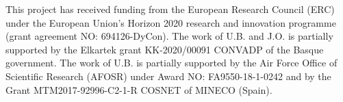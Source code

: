 \documentclass[twocolumn]{autart}    %
\begin{document}
\begin{ack}            
This project has received funding from the European Research Council (ERC) under the European Union’s Horizon 2020 research and innovation programme (grant agreement NO: 694126-DyCon). The work of U.B. and J.O. is partially supported by the Elkartek grant KK-2020/00091 CONVADP of the Basque government. The work of U.B. is partially supported by the Air Force Office of Scientific Research (AFOSR) under Award NO: FA9550-18-1-0242 and by the Grant MTM2017-92996-C2-1-R COSNET of MINECO (Spain).
\end{ack}
 


 
\end{document}
